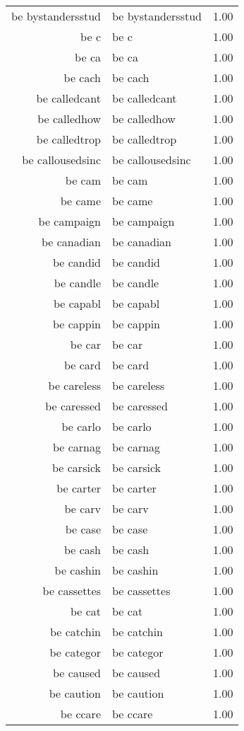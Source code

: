 \begin{table}[ht]
\begin{tabular}{rlr}
  be bystandersstud & be bystandersstud & 1.00 \\ 
  be c & be c & 1.00 \\ 
  be ca & be ca & 1.00 \\ 
  be cach & be cach & 1.00 \\ 
  be calledcant & be calledcant & 1.00 \\ 
  be calledhow & be calledhow & 1.00 \\ 
  be calledtrop & be calledtrop & 1.00 \\ 
  be callousedsinc & be callousedsinc & 1.00 \\ 
  be cam & be cam & 1.00 \\ 
  be came & be came & 1.00 \\ 
  be campaign & be campaign & 1.00 \\ 
  be canadian & be canadian & 1.00 \\ 
  be candid & be candid & 1.00 \\ 
  be candle & be candle & 1.00 \\ 
  be capabl & be capabl & 1.00 \\ 
  be cappin & be cappin & 1.00 \\ 
  be car & be car & 1.00 \\ 
  be card & be card & 1.00 \\ 
  be careless & be careless & 1.00 \\ 
  be caressed & be caressed & 1.00 \\ 
  be carlo & be carlo & 1.00 \\ 
  be carnag & be carnag & 1.00 \\ 
  be carsick & be carsick & 1.00 \\ 
  be carter & be carter & 1.00 \\ 
  be carv & be carv & 1.00 \\ 
  be case & be case & 1.00 \\ 
  be cash & be cash & 1.00 \\ 
  be cashin & be cashin & 1.00 \\ 
  be cassettes & be cassettes & 1.00 \\ 
  be cat & be cat & 1.00 \\ 
  be catchin & be catchin & 1.00 \\ 
  be categor & be categor & 1.00 \\ 
  be caused & be caused & 1.00 \\ 
  be caution & be caution & 1.00 \\ 
  be ccare & be ccare & 1.00 \\ 

\end{tabular}
\end{table}
